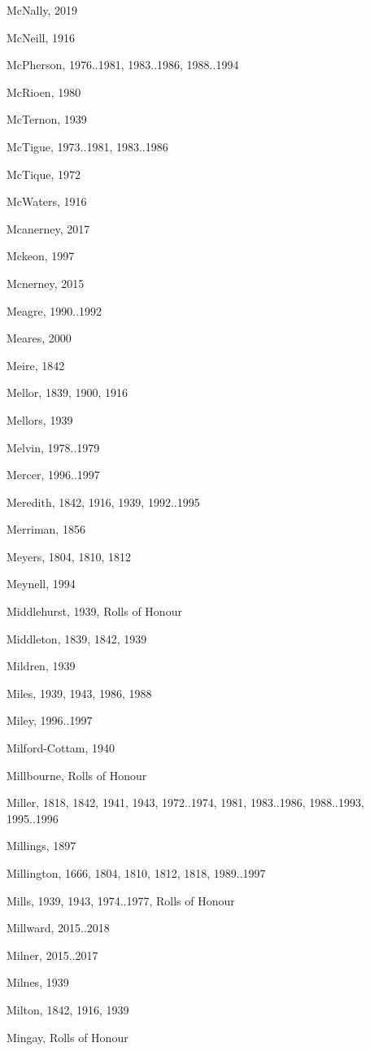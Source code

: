 \begin{theindex}
\item McNally, 2019
\item McNeill, 1916
\item McPherson, 1976..1981, 1983..1986, 1988..1994
\item McRioen, 1980
\item McTernon, 1939
\item McTigue, 1973..1981, 1983..1986
\item McTique, 1972
\item McWaters, 1916
\item Mcanerney, 2017
\item Mckeon, 1997
\item Mcnerney, 2015
\item Meagre, 1990..1992
\item Meares, 2000
\item Meire, 1842
\item Mellor, 1839, 1900, 1916
\item Mellors, 1939
\item Melvin, 1978..1979
\item Mercer, 1996..1997
\item Meredith, 1842, 1916, 1939, 1992..1995
\item Merriman, 1856
\item Meyers, 1804, 1810, 1812
\item Meynell, 1994
\item Middlehurst, 1939, Rolls of Honour
\item Middleton, 1839, 1842, 1939
\item Mildren, 1939
\item Miles, 1939, 1943, 1986, 1988
\item Miley, 1996..1997
\item Milford-Cottam, 1940
\item Millbourne, Rolls of Honour
\item Miller, 1818, 1842, 1941, 1943, 1972..1974, 1981, 1983..1986, 1988..1993, 1995..1996
\item Millings, 1897
\item Millington, 1666, 1804, 1810, 1812, 1818, 1989..1997
\item Mills, 1939, 1943, 1974..1977, Rolls of Honour
\item Millward, 2015..2018
\item Milner, 2015..2017
\item Milnes, 1939
\item Milton, 1842, 1916, 1939
\item Mingay, Rolls of Honour

\end{theindex}
